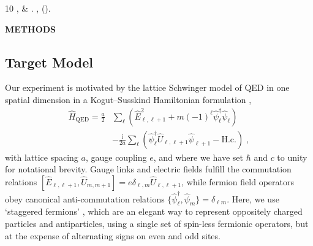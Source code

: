 \documentclass[aps,prl,twocolumn,superscriptaddress,footinbib,linenumbers]{revtex4}
\begin{document}
\begin{thebibliography}{10}
 ,  \& \newblock {}. \newblock \emph{} \textbf{},  ().

\end{thebibliography}



\clearpage
\newpage
\onecolumngrid
\vspace*{0.5cm}
\begin{center}
    \textbf{METHODS}
\end{center}
\vspace*{0.5cm}
\twocolumngrid
\newpage


\setcounter{figure}{0}
\makeatletter
\makeatother
\renewcommand{\figurename}{Extended Data Fig.}

\subsection{Target Model}

Our experiment is motivated by the lattice Schwinger model of QED in one spatial dimension in a Kogut--Susskind Hamiltonian formulation \cite{Kogut:1975s},
\begin{align}
\label{eq:supp_theory1}
\hat{H}_{\mathrm{QED}} = \frac{a}{2}& \sum_{\ell} \left( \hat{E}_{\ell,\ell+1}^2 +m (-1)^{\ell} \hat{\psi}^{\dagger}_{\ell}\hat{\psi}_{\ell} \right) \nonumber\\
&-\frac{\text{i}}{2a}\sum_{\ell} \left(\hat{\psi}_{\ell}^{\dagger} \hat{U}_{\ell,\ell+1} \hat{\psi}_{\ell+1} - \mathrm{H.c.} \right)  \; ,
\end{align}
with lattice spacing $a$, gauge coupling $e$, and where we have set $\hbar$ and $c$ to unity for notational brevity. Gauge links and electric fields fulfill the commutation relations $[\hat{E}_{\ell,\ell+1},\hat{U}_{m,m+1}] = e \delta_{\ell,m}\hat{U}_{\ell,\ell+1}$, while fermion field operators obey canonical anti-commutation relations $\{\hat{\psi}_{\ell}^{\dagger},\hat{\psi}_m\} = \delta_{\ell m}$. Here, we use `staggered fermions' \cite{Susskind:1977}, which are an elegant way to represent oppositely charged particles and antiparticles, using a single set of spin-less fermionic operators, but at the expense of alternating signs on even and odd sites.
\end{document}
